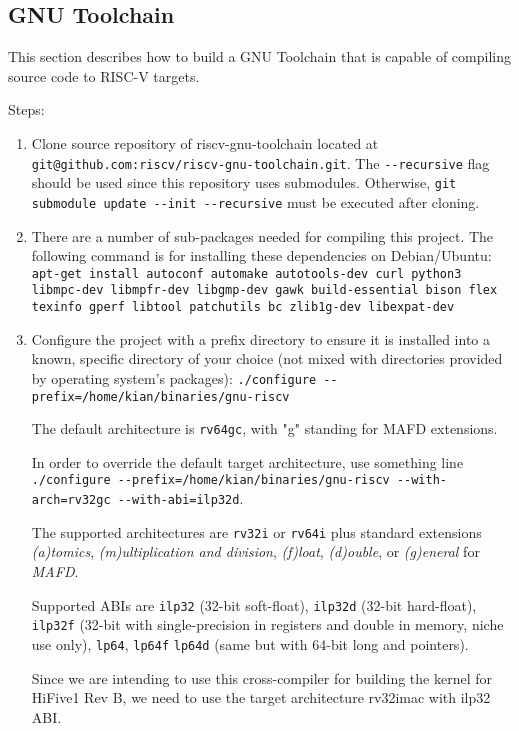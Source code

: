 \documentclass[a4paper,12pt,twoside]{report}
\begin{document}
			\subsection{GNU Toolchain}
	        This section describes how to build a GNU Toolchain that is capable of compiling source code to RISC-V targets.

            Steps:
            \begin{enumerate}
                \item Clone source repository of riscv-gnu-toolchain located at \lstinline|git@github.com:riscv/riscv-gnu-toolchain.git|. The \lstinline|--recursive| flag should be used since this repository uses submodules. Otherwise, \lstinline|git submodule update --init --recursive| must be executed after cloning.

                \item There are a number of sub-packages needed for compiling this project. The following command is for installing these dependencies on Debian/Ubuntu: \lstinline|apt-get install autoconf automake autotools-dev curl python3 libmpc-dev libmpfr-dev libgmp-dev gawk build-essential bison flex texinfo gperf libtool patchutils bc zlib1g-dev libexpat-dev|

                \item Configure the project with a prefix directory to ensure it is installed into a known, specific directory of your choice (not mixed with directories provided by operating system's packages): \lstinline|./configure --prefix=/home/kian/binaries/gnu-riscv|

                The default architecture is \lstinline|rv64gc|, with "g" standing for MAFD extensions.

                In order to override the default target architecture, use something line \lstinline|./configure --prefix=/home/kian/binaries/gnu-riscv --with-arch=rv32gc --with-abi=ilp32d|.

                The supported architectures are \lstinline|rv32i| or \lstinline|rv64i| plus standard extensions \textit{(a)tomics}, \textit{(m)ultiplication and division}, \textit{(f)loat}, \textit{(d)ouble}, or \textit{(g)eneral} for \textit{MAFD}.

                Supported ABIs are \lstinline|ilp32| (32-bit soft-float), \lstinline|ilp32d| (32-bit hard-float), \lstinline|ilp32f| (32-bit with single-precision in registers and double in memory, niche use only), \lstinline|lp64|, \lstinline|lp64f| \lstinline|lp64d| (same but with 64-bit long and pointers).

                Since we are intending to use this cross-compiler for building the kernel for HiFive1 Rev B, we need to use the target architecture rv32imac with ilp32 ABI.
            \end{enumerate}
\end{document}
